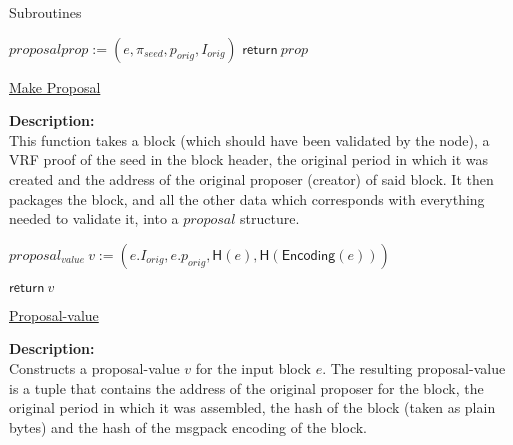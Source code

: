\documentclass[10pt,a4paper]{article}
\begin{document}
\begin{section}{Subroutines}
\begin{algorithm}[H]
    \begin{algorithmic}[1]

    \State $proposal prop := (e, \pi_{seed}, p_{orig}, I_{orig})$
    \State $\mathsf{return} \ prop$

    

    \EndFunction
    \end{algorithmic}
    \caption{\underline{Make Proposal}}
\end{algorithm}


\noindent \textbf{Description:}\\ This function takes a block (which should have been validated by the node),
a VRF proof of the seed in the block header, the original period in which it was created and the address of the
original proposer (creator) of said block. It then packages the block, and all the other data which corresponds
with everything needed to validate it, into a $proposal$ structure.

\begin{algorithm}[H]\label{proposal-value}
    \begin{algorithmic}[1]

    \State $proposal_{value} \ v := (e.I_{orig}, e.p_{orig}, \mathsf{H}(e), \mathsf{H}(\mathsf{Encoding}(e)))$

    \State $\mathsf{return} \ v$

    \EndFunction
    \end{algorithmic}
    \caption{\underline{Proposal-value}}
\end{algorithm}

\noindent \textbf{Description:}\\ Constructs a proposal-value $v$ for the input block $e$.
The resulting proposal-value is a tuple that contains the address of the original proposer for
the block, the original period in which it was assembled, the hash of the block (taken as plain bytes) 
and the hash of the msgpack encoding of the block.


\end{section}
\end{document}
